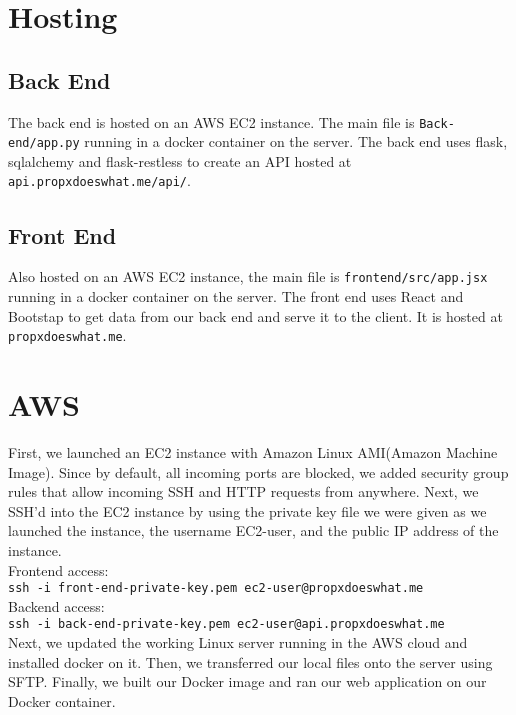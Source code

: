 \documentclass[12pt]{article}
\newcommand{\code}[1]{\texttt{#1}}
\begin{document}
\section{Hosting}

\subsection{Back End}

The back end is hosted on an AWS EC2 instance. The main file is \code{Back-end/app.py} running in a docker container on the server. The back end uses flask, sqlalchemy and flask-restless to create an API hosted at \code{api.propxdoeswhat.me/api/}.

\subsection{Front End}

Also hosted on an AWS EC2 instance, the main file is \code{frontend/src/app.jsx} running in a docker container on the server. The front end uses React and Bootstap to get data from our back end and serve it to the client. It is hosted at \code{propxdoeswhat.me}.

\section{AWS}

First, we launched an EC2 instance with Amazon Linux AMI(Amazon Machine Image). Since by default, all incoming ports are blocked, we added security group rules that allow incoming SSH and HTTP requests from anywhere. Next, we SSH'd into the EC2 instance by using the private key file we were given as we launched the instance, the username EC2-user, and the public IP address of the instance. \\

Frontend access: \\
\code{ssh -i front-end-private-key.pem ec2-user@propxdoeswhat.me} \\
Backend access: \\
\code{ssh -i back-end-private-key.pem ec2-user@api.propxdoeswhat.me} \\

Next, we updated the working Linux server running in the AWS cloud and installed docker on it. Then, we transferred our local files onto the server using SFTP. Finally, we built our Docker image and ran our web application on our Docker container.
\end{document}
